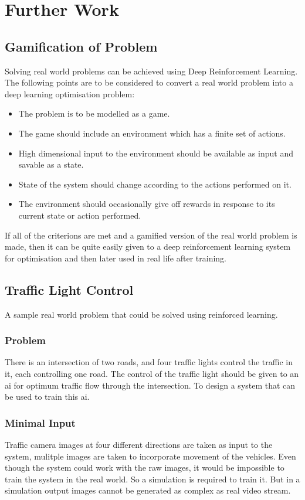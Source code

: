\documentclass[a4paper,11pt]{report}
\begin{document}
	\chapter{Further Work}
		\section{Gamification of Problem}
			Solving real world problems can be achieved using Deep Reinforcement Learning. The following points are to be considered to convert a real world problem into a deep learning optimisation problem:
			\begin{itemize}
				\setlength\itemsep{0em}
				\item The problem is to be modelled as a game.
				\item The game should include an environment which has a finite set of actions.
				\item High dimensional input to the environment should be available as input and savable as a state.
				\item State of the system should change according to the actions performed on it.
				\item The environment should occasionally give off rewards in response to its current state or action performed.
			\end{itemize}

			If all of the criterions are met and a gamified version of the real world problem is made, then it can be quite easily given to a deep reinforcement learning system for optimisation and then later used in real life after training.

		\section{Traffic Light Control}
				A sample real world problem that could be solved using reinforced learning.
			\subsection{Problem}
				There is an intersection of two roads, and four traffic lights control the traffic in it, each controlling one road. The control of the traffic light should be given to an \ac{ai} for optimum traffic flow through the intersection. To design a system that can be used to train this \ac{ai}. 

			\subsection{Minimal Input}
				Traffic camera images at four different directions are taken as input to the system, mulitple images are taken to incorporate movement of the vehicles. Even though the system could work with the raw images, it would be impossible to train the system in the real world. So a simulation is required to train it. But in a simulation output images cannot be generated as complex as real video stream. 
\end{document}
